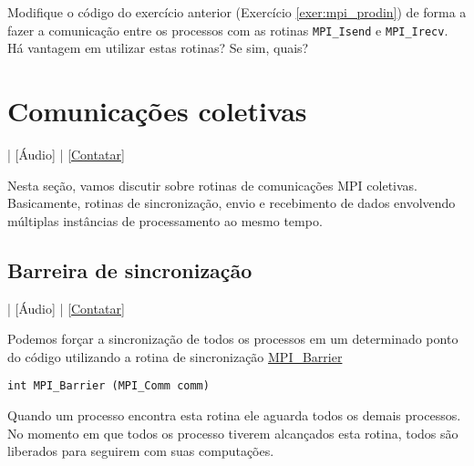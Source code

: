 \begin{exer}
  Modifique o código do exercício anterior (Exercício \ref{exer:mpi_prodin}) de forma a fazer a comunicação entre os processos com as rotinas \verb+MPI_Isend+ e \verb+MPI_Irecv+. Há vantagem em utilizar estas rotinas? Se sim, quais?
\end{exer}

\section {Comunicações coletivas}\label{cap_mpi_sec_colcom}

\begin{flushright}
  [Vídeo] | [Áudio] | \href{https://phkonzen.github.io/notas/contato.html}{[Contatar]}
\end{flushright}

Nesta seção, vamos discutir sobre rotinas de comunicações MPI coletivas. Basicamente, rotinas de sincronização, envio e recebimento de dados envolvendo múltiplas instâncias de processamento ao mesmo tempo.

\subsection {Barreira de sincronização}

\begin{flushright}
  [Vídeo] | [Áudio] | \href{https://phkonzen.github.io/notas/contato.html}{[Contatar]}
\end{flushright}

Podemos forçar a sincronização de todos os processos em um determinado ponto do código utilizando a rotina de sincronização \href{https://www.open-mpi.org/doc/current/man3/MPI\_Barrier.3.php}{MPI\_Barrier}
\begin{verbatim}
int MPI_Barrier (MPI_Comm comm)
\end{verbatim}
Quando um processo encontra esta rotina ele aguarda todos os demais processos. No momento em que todos os processo tiverem alcançados esta rotina, todos são liberados para seguirem com suas computações.

